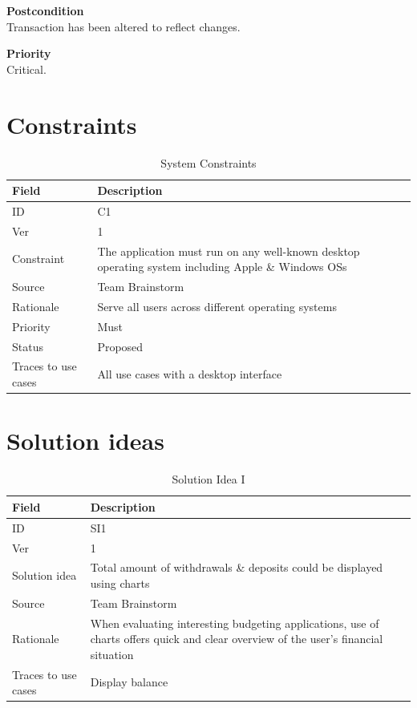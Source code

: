 \documentclass[12pt]{article}
\begin{document}
\noindent
    {\bf Postcondition}\\
    Transaction has been altered to reflect changes.

\noindent
{\bf Priority}\\
Critical.


\section{Constraints}
\begin{table}[H]
\caption{System Constraints}
  \begin{center}
    \begin{tabular}{|l|p{10cm}|}
      \hline
      Field & Description\\
      \hline\hline
      ID & C1\\
      \hline
      Ver & 1\\
      \hline
      Constraint & The application must run on any well-known desktop operating system including Apple \& Windows OSs\\
      \hline
      Source & Team Brainstorm\\
      \hline
      Rationale & Serve all users across different operating systems\\
      \hline
      Priority & Must\\
      \hline
      Status & Proposed\\
      \hline
      Traces to use cases & All use cases with a desktop interface\\
      \hline
    \end{tabular}
  \end{center}
\end{table}

\section{Solution ideas}
\begin{table}[H]
\caption{Solution Idea I}
  \begin{center}
    \begin{tabular}{|l|p{10cm}|}
      \hline
      Field & Description\\
      \hline\hline
      ID & SI1\\
      \hline
      Ver & 1\\
      \hline
      Solution idea & Total amount of withdrawals \& deposits could be displayed using charts\\
      \hline
      Source & Team Brainstorm\\
      \hline
      Rationale & When evaluating interesting budgeting applications, use of charts offers quick and clear overview of the user's financial situation\\
      \hline
      Traces to use cases & Display balance\\
      \hline
    \end{tabular}
  \end{center}
\end{table}
\end{document}
